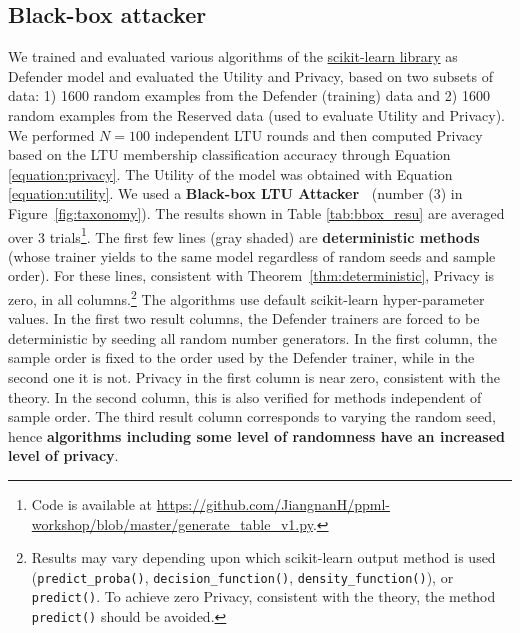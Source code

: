 \documentclass[letterpaper]{article}
\newcommand{\oracle}{LTU Attacker~}
\begin{document}
\subsection{Black-box attacker}
We trained and evaluated various algorithms of the \href{https://scikit-learn.org/stable/}{scikit-learn library} as Defender model and evaluated the Utility and Privacy, based on two subsets of data: 1) 1600 random examples from the Defender (training) data and 2) 1600 random examples from the Reserved data (used to evaluate Utility and Privacy). We performed $N=100$ independent LTU rounds and then computed  Privacy based on the LTU membership classification accuracy through Equation \ref{equation:privacy}. The Utility of the model was obtained with Equation \ref{equation:utility}. We used a {\bf Black-box \oracle} (number (3) in Figure~\ref{fig:taxonomy}).
The results shown in Table \ref{tab:bbox_resu} are averaged over 3 trials\footnote{Code is available at \url{https://github.com/JiangnanH/ppml-workshop/blob/master/generate_table_v1.py}.}.
The first few lines (gray shaded) are {\bf deterministic methods} (whose trainer yields to the same model regardless of random seeds and sample order). For these lines, consistent with Theorem~\ref{thm:deterministic}, Privacy is zero, in all columns.\footnote{ Results may vary depending upon which scikit-learn output method is used (\texttt{predict\_proba()}, \texttt{decision\_function()}, \texttt{density\_function()}), or \texttt{predict()}. To achieve zero Privacy, consistent with the theory, the method \texttt{predict()} should be avoided.}
The algorithms use default scikit-learn hyper-parameter values.
In the first two result columns, the Defender trainers are forced to be deterministic by seeding all random number generators. In the first column, the sample order is fixed to the order used by the Defender trainer, while in the second one it is not. Privacy in the first column is near zero, consistent with the theory. In the second column, this is also verified for methods independent of sample order.
The third result column corresponds to varying the random seed, hence {\bf algorithms including some level of randomness have an increased level of privacy}.


\end{document}
